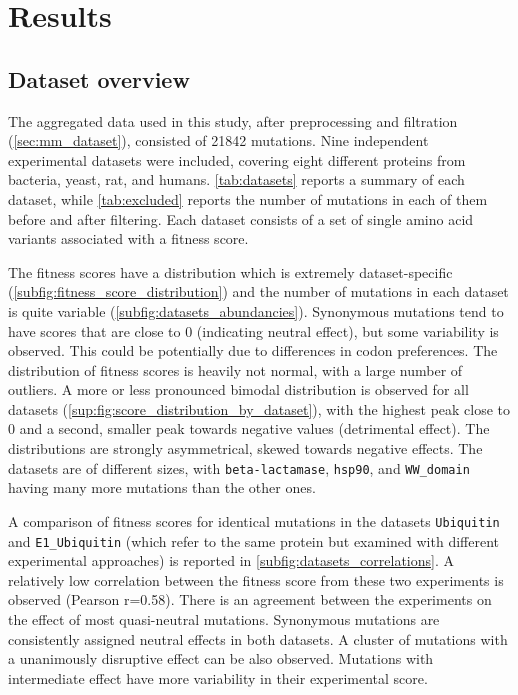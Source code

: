 \thispagestyle{empty}
\cleardoublepage%
\chapter{Results}

\section{Dataset overview}\label{sec:res_dataset}
The aggregated data used in this study, after preprocessing and filtration (\autoref{sec:mm_dataset}), consisted of \num{21842} mutations.
Nine independent experimental datasets were included, covering eight different proteins from bacteria, yeast, rat, and humans.
\autoref{tab:datasets} reports a summary of each dataset, while \autoref{tab:excluded} reports the number of mutations in each of them before and after filtering.
Each dataset consists of a set of single amino acid variants associated with a fitness score.

The fitness scores have a distribution which is extremely dataset-specific (\autoref{subfig:fitness_score_distribution}) and the number of mutations in each dataset is quite variable (\autoref{subfig:datasets_abundancies}).
Synonymous mutations tend to have scores that are close to \num{0} (indicating neutral effect), but some variability is observed.
This could be potentially due to differences in codon preferences.
The distribution of fitness scores is heavily not normal, with a large number of outliers.
A more or less pronounced bimodal distribution is observed for all datasets (\autoref{sup:fig:score_distribution_by_dataset}), with the highest peak close to \num{0} and a second, smaller peak towards negative values (detrimental effect).
The distributions are strongly asymmetrical, skewed towards negative effects.
The datasets are of different sizes, with \texttt{beta-lactamase}, \texttt{hsp90}, and \texttt{WW\_domain} having many more mutations than the other ones.

A comparison of fitness scores for identical mutations in the datasets \texttt{Ubiquitin} and \texttt{E1\_Ubiquitin} (which refer to the same protein but examined with different experimental approaches) is reported in \autoref{subfig:datasets_correlations}.
A relatively low correlation between the fitness score from these two experiments is observed (Pearson r=\num{0.58}).
There is an agreement between the experiments on the effect of most quasi-neutral mutations.
Synonymous mutations are consistently assigned neutral effects in both datasets.
A cluster of mutations with a unanimously disruptive effect can be also observed.
Mutations with intermediate effect have more variability in their experimental score.

